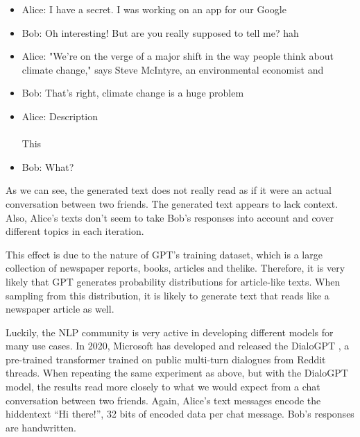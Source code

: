 \begin{example}
\leavevmode
\begin{itemize}
\item Alice: I have a secret. I was working on an app for our Google
\item Bob:   Oh interesting! But are you really supposed to tell me? hah
\item Alice: "We're on the verge of a major shift in the way people think about climate change," says Steve McIntyre, an environmental economist and
\item Bob:   That's right, climate change is a huge problem
\item Alice: Description \\
\\
       This
\item Bob:   What?
\end{itemize}
\end{example}

As we can see, the generated text does not really read as if it were an actual conversation between two friends.
The generated text appears to lack context.
Also, Alice's texts don't seem to take Bob's responses into account and cover different topics in each iteration.

This effect is due to the nature of GPT's training dataset, which is a large collection of newspaper reports, books, articles and thelike.
Therefore, it is very likely that GPT generates probability distributions for article-like texts.
When sampling from this distribution, it is likely to generate text that reads like a newspaper article as well.

Luckily, the NLP community is very active in developing different models for many use cases.
In 2020, Microsoft has developed and released the DialoGPT \cite{Zhang2020}, a pre-trained transformer trained on public multi-turn dialogues from Reddit threads.
When repeating the same experiment as above, but with the DialoGPT model, the results read more closely to what we would expect from a chat conversation between two friends.
Again, Alice's text messages encode the hiddentext ``Hi there!'', 32 bits of encoded data per chat message.
Bob's responses are handwritten.

